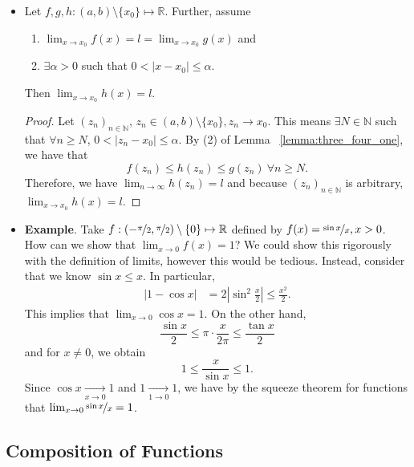\documentclass{article}
\newcommand{\R}{\mathbb{R}}
\newcommand{\N}{\mathbb{N}}
\newcommand{\seq}[2]{(#1_{#2})_{#2 \in \N}}
\newcommand{\?}{\stackrel{?}{=}}
\theoremstyle{definition} %
\begin{document}
\begin{itemize}
\begin{proof}
    \end{proof}
    \item[]
    \begin{theorem}
        Let $f, g, h: (a, b) \setminus \{x_0\} \mapsto \R$. Further, assume
        \begin{enumerate}[label=(\arabic*)]
            \item $\lim_{x \to x_0} f(x) = l = \lim_{x \to x_0} g(x)$ and
            \item $\exists \alpha > 0$ such that $0 < |x - x_0| \leq \alpha$.
        \end{enumerate}
        Then $\lim_{x \to x_0} h(x) = l$.
    \end{theorem}
    \begin{proof}
        Let $\seq{z}{n}$, $z_n \in (a, b) \setminus \{x_0\}, z_n \rightarrow x_0$. This means $\exists N \in \N$ such that $\forall n \geq N$, $0 < |z_n - x_0| \leq \alpha$. By (2) of Lemma ~\ref{lemma:three_four_one}, we have that $$f(z_n) \leq h(z_n) \leq g(z_n) \ \forall n \geq N.$$
        Therefore, we have $\lim_{n \to \infty} h(z_n) = l$ and because $\seq{z}{n}$ is arbitrary, $\lim_{x \to x_0} h(x) = l$.
    \end{proof}
    \item \textbf{Example}. Take $f: (-\nicefrac{\pi}{2}, \nicefrac{\pi}{2}) \setminus \{0\} \mapsto \R$ defined by $f(x) = \nicefrac{\sin x}{x}, x > 0$. How can we show that $\lim_{x \to 0} f(x) = 1$? We could show this rigorously with the definition of limits, however this would be tedious. Instead, consider that we know $\sin x \leq x$. In particular,
    \begin{align*}
        |1 - \cos x| &= 2\left|\sin^2 \frac{x}{2}\right| \leq \frac{x^2}{2}.
    \end{align*}
    This implies that $\lim_{x \to 0} \cos x = 1$. On the other hand,
    $$\frac{\sin x}{2} \leq \pi \cdot \frac{x}{2\pi} \leq \frac{\tan x}{2}$$
    and for $x \neq 0$, we obtain
    $$1 \leq \frac{x}{\sin x} \leq 1.$$
    Since $\cos x \underset{x \to 0}{\longrightarrow} 1$ and $1 \underset{1 \to 0}{\longrightarrow} 1$, we have by the squeeze theorem for functions that $\lim_{x \to 0} \nicefrac{\sin x}{x} = 1$.
\end{itemize}

\subsection{Composition of Functions}
\end{document}
